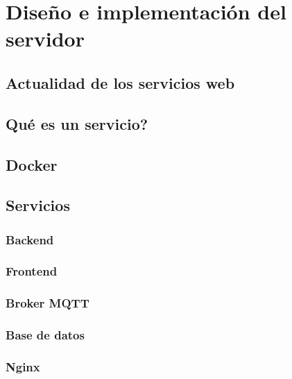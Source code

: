 \chapter{Diseño e implementación del servidor}

\section{Actualidad de los servicios web}

\section{Qué es un servicio?}

\section{Docker}

\section{Servicios}

\subsection{Backend}

\subsection{Frontend}

\subsection{Broker MQTT}

\subsection{Base de datos}

\subsection{Nginx}